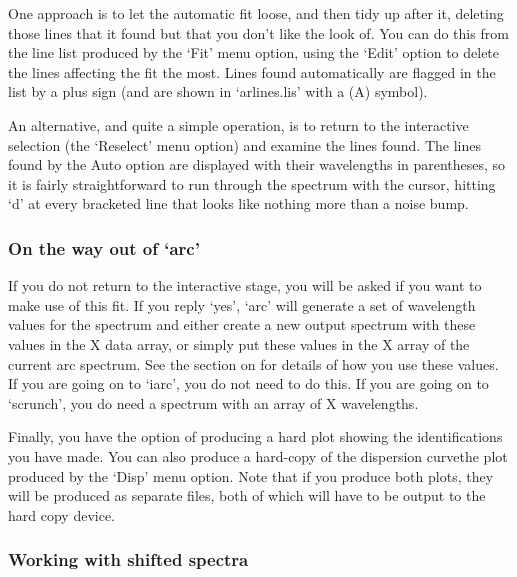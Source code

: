    One approach is to let the automatic fit loose, and then tidy up
   after it, deleting those lines that it found but that you don't like
   the look of.  You can do this from the line list produced by the
   `Fit' menu option, using the `Edit' option to delete the lines
   affecting the fit the most.  Lines found automatically are flagged in
   the list by a plus sign (and are shown in `arlines.lis' with a (A)
   symbol).

   An alternative, and quite a simple operation, is to return to the
   interactive selection (the `Reselect' menu option) and examine the
   lines found.  The lines found by the Auto option are displayed with
   their wavelengths in parentheses, so it is fairly straightforward to
   run through the spectrum with the cursor, hitting `d' at every
   bracketed line that looks like nothing more than a noise bump.


\subsubsection{\label{techno10wayout}On the way out of `arc'}

   If you do not return to the interactive stage, you will be asked if
   you want to make use of this fit.  If you reply `yes', `arc' will
   generate a set of wavelength values for the spectrum and either
   create a new output spectrum with these values in the X data array,
   or simply put these values in the X array of the current arc
   spectrum.  See
   {the section on }
   for details of how you use these values.  If you are going on to
   `iarc', you do not need to do this.  If you are going on to
   `scrunch', you do need a spectrum with an array of X wavelengths.

   Finally, you have the option of producing a hard plot showing the
   identifications you have made. You can also produce a hard-copy of
   the dispersion curve\latorhtm{---}{-}the plot produced by the `Disp' menu
   option.
   Note that if you produce both plots, they will be produced as
   separate files, both of which will have to be output to the hard copy
   device.


\subsubsection{\label{techno10shifted}Working with shifted spectra}

